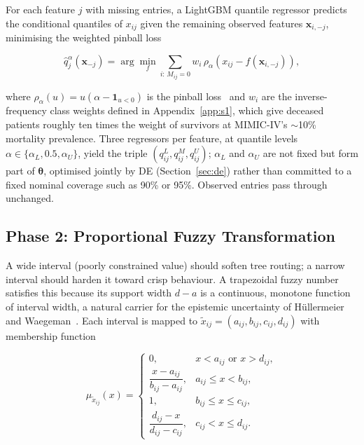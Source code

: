 \documentclass[journal]{IEEEtran}
\begin{document}
For each feature $j$ with missing entries, a LightGBM quantile regressor predicts the conditional quantiles of $x_{ij}$ given the remaining observed features $\mathbf{x}_{i,-j}$, minimising the weighted pinball loss

\begin{equation}
	\hat{q}^{\alpha}_{j}(\mathbf{x}_{-j})
	=\arg\min_{f}
	\sum_{i:\,M_{ij}=0}
	w_i\,\rho_{\alpha}\!\left(x_{ij}-f(\mathbf{x}_{i,-j})\right),
	\label{eq:quantile_regression}
\end{equation}

\noindent where $\rho_{\alpha}(u)=u(\alpha-\mathbf{1}_{u<0})$ is the pinball loss~\cite{koenker1978regression} and $w_i$ are the inverse-frequency class weights defined in Appendix~\ref{app:s1}, which give deceased patients roughly ten times the weight of survivors at MIMIC-IV's $\sim$10\% mortality prevalence. Three regressors per feature, at quantile levels $\alpha\in\{\alpha_L,0.5,\alpha_U\}$, yield the triple $(q^L_{ij},q^M_{ij},q^U_{ij})$; $\alpha_L$ and $\alpha_U$ are not fixed but form part of $\boldsymbol{\theta}$, optimised jointly by DE (Section~\ref{sec:de}) rather than committed to a fixed nominal coverage such as 90\% or 95\%. Observed entries pass through unchanged.

\subsection{Phase 2: Proportional Fuzzy Transformation}
\label{sec:phase2}

A wide interval (poorly constrained value) should soften tree routing; a narrow interval should harden it toward crisp behaviour. A trapezoidal fuzzy number~\cite{zimmermann2001fuzzy} satisfies this because its support width $d-a$ is a continuous, monotone function of interval width, a natural carrier for the epistemic uncertainty of Hüllermeier and Waegeman~\cite{hullermeier2021aleatoric}. Each interval is mapped to $\tilde{x}_{ij}=(a_{ij},b_{ij},c_{ij},d_{ij})$ with membership function

\begin{equation}
	\mu_{\tilde{x}_{ij}}(x)=
	\begin{cases}
		0, & x<a_{ij}\text{ or }x>d_{ij},\\[4pt]
		\dfrac{x-a_{ij}}{b_{ij}-a_{ij}}, & a_{ij}\le x<b_{ij},\\[6pt]
		1, & b_{ij}\le x\le c_{ij},\\[4pt]
		\dfrac{d_{ij}-x}{d_{ij}-c_{ij}}, & c_{ij}<x\le d_{ij}.
	\end{cases}
	\label{eq:trapezoid_membership}
\end{equation}
\end{document}
